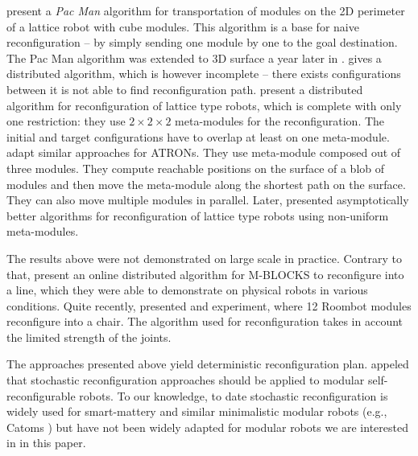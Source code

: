 \textcite{DBLP:conf/iros/ButlerBR01} present a \emph{Pac Man} algorithm for
transportation of modules on the 2D perimeter of a lattice robot with cube
modules. This algorithm is a base for naive reconfiguration -- by simply sending
one module by one to the goal destination. The Pac Man algorithm was extended to
3D surface a year later in \cite{DBLP:conf/wafr/ButlerR02}.
\textcite{DBLP:journals/dc/WalterWA00} gives a distributed algorithm, which is
however incomplete -- there exists configurations between it is not able to find
reconfiguration path. \textcite{DBLP:conf/icra/VassilvitskiiYS02} present a
distributed algorithm for reconfiguration of lattice type robots, which is
complete with only one restriction: they use $2\times2\times2$ meta-modules for
the reconfiguration. The initial and target configurations have to overlap at
least on one meta-module. \textcite{DBLP:conf/ieeealife/Christensen07} adapt
similar approaches for ATRONs. They use meta-module composed out of three
modules. They compute reachable positions on the surface of a blob of modules
and then move the meta-module along the shortest path on the surface. They can
also move multiple modules in parallel. Later,
\textcite{DBLP:journals/comgeo/AloupisBDDFIW13} presented asymptotically better
algorithms for reconfiguration of lattice type robots using non-uniform
meta-modules.

The results above were not demonstrated on large scale in practice. Contrary to
that, \textcite{DBLP:conf/iros/RomanishinMR19} present an online distributed
algorithm for M-BLOCKS to reconfigure into a line, which they were able to
demonstrate on physical robots in various conditions. Quite recently,
\textcite{DBLP:journals/ras/HauserMLKBI20} presented and experiment, where 12
Roombot modules reconfigure into a chair. The algorithm used for reconfiguration
takes in account the limited strength of the joints.

The approaches presented above yield deterministic reconfiguration plan.
\textcite{4141032} appeled that stochastic reconfiguration approaches should be
applied to modular self-reconfigurable robots. To our knowledge, to date
stochastic reconfiguration is widely used for smart-mattery and similar
minimalistic modular robots (e.g., Catoms \cite{DBLP:conf/aaai/KirbyCAPHMG05})
but have not been widely adapted for  modular robots we are
interested in in this paper.



